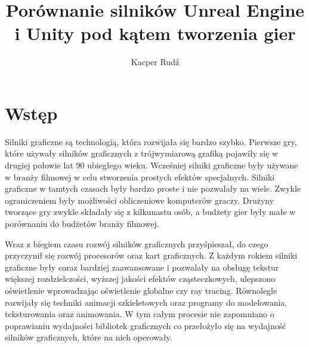 \documentclass[12pt,twoside]{article}
\author{Kacper Rudź}
\title{Porównanie silników Unreal Engine i Unity pod kątem tworzenia gier}
\begin{document}
\maketitle

\blankpage

\tableofcontents

\clearpage
\blankpage




\section{Wstęp}

Silniki graficzne są technologią, która rozwijała się bardzo szybko. Pierwsze
gry, które używały silników graficznych z trójwymiarową grafiką pojawiły się w
drugiej połowie lat 90 ubiegłego wieku. Wcześniej silniki graficzne były używane
w branży filmowej w celu stworzenia prostych efektów specjalnych. Silniki
graficzne w tamtych czasach były bardzo proste i nie pozwalały na wiele. Zwykle
ograniczeniem były możliwości obliczeniowe komputerów graczy. Drużyny tworzące
gry zwykle składały się z kilkunastu osób, a budżety gier były małe w porównaniu
do budżetów branży filmowej. 

Wraz z biegiem czasu rozwój silników graficznych przyśpieszał, do czego
przyczynił się rozwój procesorów oraz kart graficznych. Z każdym rokiem silniki
graficzne były coraz bardziej zaawansowane i pozwalały na obsługę tekstur
większej rozdzielczości, wyższej jakości efektów cząsteczkowych, ulepszono
oświetlenie wprowadzając oświetlenie globalne czy ray tracing. Równolegle
rozwijały się techniki animacji szkieletowych oraz programy do modelowania,
teksturowania oraz animowania. W tym całym procesie nie zapomniano o poprawianiu
wydajności bibliotek graficznych co przełożyło się na wydajność silników
graficznych, które na nich operowały. 
\end{document}
